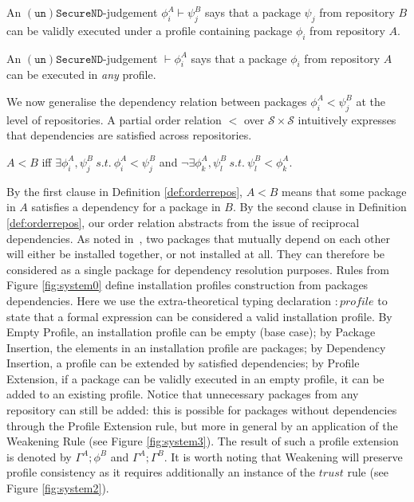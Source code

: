 \documentclass[]{llncs}
\begin{document}
\begin{definition}[Judgements]
An $\mathtt{(un)SecureND}$-judgement $\phi^{A}_{i} \vdash \psi^{B}_{j}$ says that a package $\psi_{j}$ from repository $B$ can be validly executed under a profile containing package $\phi_{i}$ from repository $A$.
\end{definition}

\begin{definition}[Validity]
An $\mathtt{(un)SecureND}$-judgement $\vdash \phi^{A}_{i}$ says that a package $\phi_{i}$ from repository $A$ can be executed in \textit{any} profile.
\end{definition}



We now generalise the dependency relation between packages $\phi^{A}_{i}<\psi^{B}_{j}$ at the level of repositories. A partial order relation $<$ over $\mathcal{S}\times \mathcal{S}$ intuitively expresses that dependencies are satisfied across repositories.

\begin{definition}\label{def:orderrepos}
	$A< B$  iff $\exists \phi^{A}_{i}, \psi^{B}_{j}\ s.t.\ \phi^{A}_{i}<\psi^{B}_{j}$ and $\neg \exists \phi^{A}_{k}, \psi^{B}_{l}\ s.t.\ \psi^{B}_{l}<\phi^{A}_{k}$.
\end{definition}
By the first clause in Definition \ref{def:orderrepos}, $A< B$ means that some package in $A$ satisfies a dependency for a package in $B$. By the second clause in Definition \ref{def:orderrepos}, our order relation abstracts from the issue of reciprocal dependencies. As noted in~\cite{DBLP:journals/eceasst/Boender11}, two packages that mutually depend on each other will either be installed together, or not installed at all. They can therefore be considered as a single package for dependency resolution purposes.
Rules from Figure \ref{fig:system0} define installation profiles construction from packages dependencies. Here we use the extra-theoretical typing declaration $\!:\!profile$ to state that a formal expression can be considered a valid installation profile. By Empty Profile, an installation profile can be empty (base case); by Package Insertion, the elements in an installation profile are packages; by Dependency Insertion, a profile can be extended by satisfied dependencies; by Profile Extension, if a package can be validly executed in an empty profile, it can be added to an existing profile. Notice that unnecessary packages from any repository can still be added: this is possible for packages without dependencies through the Profile Extension rule, but more in general by an application of the Weakening Rule (see Figure \ref{fig:system3}). The result of such a profile extension is denoted by $\Gamma^{A}; \phi^{B}$ and $\Gamma^{A}; \Gamma^{B}$. It is worth noting that Weakening will preserve profile consistency as it requires additionally an instance of the $trust$ rule (see Figure \ref{fig:system2}).
\end{document}
